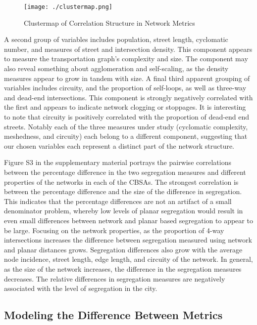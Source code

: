\documentclass[
  10pt,
]{article}
\begin{document}
\begin{figure}
\hypertarget{fig:heatmap}{%
\centering
\texttt{[image: ./clustermap.png]}
\caption{Clustermap of Correlation Structure in Network
Metrics}\label{fig:heatmap}
}
\end{figure}

A second group of variables includes population, street length,
cyclomatic number, and measures of street and intersection density. This
component appears to measure the transportation graph's complexity and
size. The component may also reveal something about agglomeration and
self-scaling, as the density measures appear to grow in tandem with
size. A final third apparent grouping of variables includes circuity,
and the proportion of self-loops, as well as three-way and dead-end
intersections. This component is strongly negatively correlated with the
first and appears to indicate network clogging or stoppages. It is
interesting to note that circuity is positively correlated with the
proportion of dead-end end streets. Notably each of the three measures
under study (cyclomatic complexity, meshedness, and circuity) each
belong to a different component, suggesting that our chosen variables
each represent a distinct part of the network structure.

Figure S3 in the supplementary material portrays the pairwise
correlations between the percentage difference in the two segregation
measures and different properties of the networks in each of the CBSAs.
The strongest correlation is between the percentage difference and the
size of the difference in segregation. This indicates that the
percentage differences are not an artifact of a small denominator
problem, whereby low levels of planar segregation would result in even
small differences between network and planar based segregation to appear
to be large. Focusing on the network properties, as the proportion of
4-way intersections increases the difference between segregation
measured using network and planar distances grows. Segregation
differences also grow with the average node incidence, street length,
edge length, and circuity of the network. In general, as the size of the
network increases, the difference in the segregation measures decreases.
The relative differences in segregation measures are negatively
associated with the level of segregation in the city.

\hypertarget{modeling-the-difference-between-metrics}{%
\subsection{Modeling the Difference Between
Metrics}\label{modeling-the-difference-between-metrics}}
\end{document}
